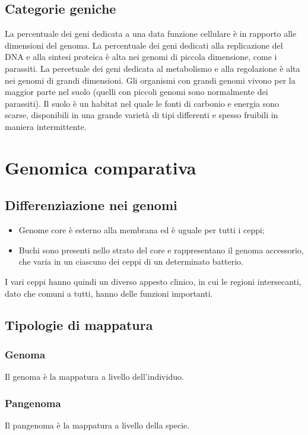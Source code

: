 	\subsection{Categorie geniche}
	La percentuale dei geni dedicata a una data funzione cellulare \`e in rapporto alle dimensioni del genoma. 
	La percentuale dei geni dedicati alla replicazione del DNA e alla sintesi proteica \`e alta nei genomi di piccola dimensione, come i parassiti. 
	La percetuale dei geni dedicata al metabolismo e alla regolazione \`e alta nei genomi di grandi dimensioni. 
 	Gli organismi con grandi genomi vivono per la maggior parte nel suolo (quelli con piccoli genomi sono normalmente dei parassiti). 
	Il suolo \`e un habitat nel quale le fonti di carbonio e energia sono scarse, disponibili in una grande variet\`a di tipi differenti e spesso fruibili in maniera intermittente. 

\section{Genomica comparativa}

	\subsection{Differenziazione nei genomi}
	\begin{itemize}
	    \item Genome core \`e esterno alla membrana ed \`e uguale per tutti i ceppi;
	    \item Buchi sono presenti nello strato del core e rappresentano il genoma accessorio, che varia in un ciascuno dei ceppi di un determinato batterio.
	\end{itemize}
	I vari ceppi hanno quindi un diverso appesto clinico, in cui le regioni intersecanti, dato che comuni a tutti, hanno delle funzioni importanti. 
	
	\subsection{Tipologie di mappatura}

		\subsubsection{Genoma}
		Il genoma \`e la mappatura a livello dell'individuo.

		\subsubsection{Pangenoma}
		Il pangenoma \`e la mappatura a livello della specie.

